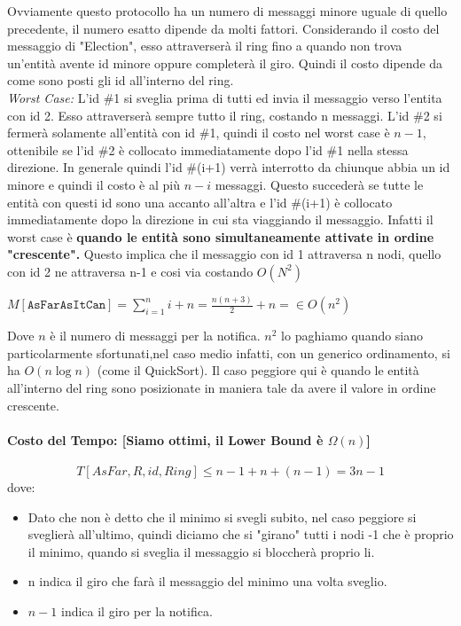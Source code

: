 Ovviamente questo protocollo ha un numero di messaggi minore uguale di quello
precedente, il numero esatto dipende da molti fattori. Considerando il costo del
messaggio di "Election", esso attraverserà il ring fino a quando non trova
un'entità avente id minore oppure completerà il giro. Quindi il costo dipende da
come sono posti gli id all'interno del ring.\\
\textit{Worst Case:} L'id \#1 si sveglia prima di tutti ed invia il messaggio
verso l'entita con id 2. Esso attraverserà sempre tutto il ring, costando n
messaggi. L'id \#2 si fermerà solamente all'entità con id \#1, quindi il costo
nel worst case è $n-1$, ottenibile se l'id \#2 è collocato immediatamente dopo
l'id \#1 nella stessa direzione. In generale quindi l'id \#(i+1) verrà
interrotto da chiunque abbia un id minore e quindi il costo è al più $n-i$
messaggi. Questo succederà se tutte le entità con questi id sono una accanto
all'altra e l'id \#(i+1) è collocato immediatamente dopo la direzione in cui sta
viaggiando il messaggio. Infatti il worst case è \textbf{quando le entità sono
    simultaneamente attivate in ordine "crescente".} Questo implica che il messaggio
con id 1 attraversa n nodi, quello con id 2 ne attraversa n-1 e cosi via
costando $O(N^2)$
\begin{center}
    $M[\texttt{AsFarAsItCan}] = \sum_{i=1}^{n} i + n = \frac{n(n+3)}{2} + n = \in
        O(n^2)$
\end{center}
Dove $n$ è il numero di messaggi per la notifica. $n^2$ lo paghiamo quando siano
particolarmente sfortunati,nel caso medio infatti, con un generico ordinamento,
si ha $O(n \log n)$ (come il QuickSort). Il caso peggiore qui è quando le entità
all'interno del ring sono posizionate in maniera tale da avere il valore in
ordine crescente.

\paragraph{Costo del Tempo: [Siamo ottimi, il Lower Bound è $\Omega(n)$]}
$$T[AsFar,R,id,Ring] \leq n-1 + n + (n-1) = 3n - 1$$ dove:
\begin{itemize}
    \item Dato che non è detto che il minimo si svegli subito, nel caso peggiore
          si sveglierà all'ultimo, quindi diciamo che si "girano" tutti i nodi -1 che è
          proprio il minimo, quando si sveglia il messaggio si bloccherà proprio li.
    \item n indica il giro che farà il messaggio del minimo una volta sveglio.
    \item $n - 1$ indica il giro per la notifica.
\end{itemize}

